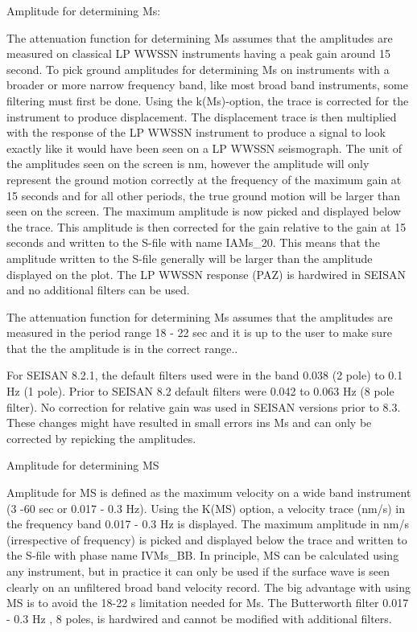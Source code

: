 Amplitude for determining Ms: 

The attenuation function for determining Ms assumes that the amplitudes are measured on classical LP WWSSN instruments having a peak gain around 15 second. To pick ground amplitudes for determining Ms on instruments with a broader or more narrow frequency band, like most broad band instruments, some filtering must first be done. Using the k(Ms)-option, the trace is corrected for the instrument to produce displacement. The displacement trace is then multiplied with the response of the LP WWSSN instrument to produce a signal to look exactly like it would have been seen on a LP WWSSN seismograph. The unit of the amplitudes seen on the screen is nm, however the amplitude will only represent the ground motion correctly at the frequency of the maximum gain at 15 seconds  and for all other periods, the true ground motion will be larger than seen on the screen. The maximum amplitude is now picked and displayed below the trace. This amplitude is then corrected for the gain relative to the gain at 15 seconds and written to the S-file with name IAMs\_20. This means that the amplitude written to the S-file generally will be larger than the amplitude displayed on the plot. The LP WWSSN response (PAZ) is hardwired in SEISAN and no additional filters can be used.

The attenuation function for determining Ms assumes that the amplitudes are measured in the period range 18 - 22 sec and it is up to the user to make sure that the the amplitude is in the correct range.. 

For SEISAN 8.2.1, the default filters used were in the band 0.038 (2 pole) to 0.1 Hz (1 pole). Prior to SEISAN 8.2 default filters were 0.042 to 0.063 Hz (8 pole filter). No correction for relative gain was used in SEISAN versions prior to 8.3. These changes might have resulted in small errors ins Ms and can only be corrected by repicking the amplitudes.

Amplitude for determining MS

Amplitude for MS is defined as the maximum velocity on a wide band instrument (3 -60 sec or 0.017 - 0.3 Hz). Using the K(MS) option, a velocity trace (nm/s) in the frequency band 0.017 - 0.3 Hz is displayed. The maximum amplitude in nm/s (irrespective of frequency) is picked and displayed below the trace and written to the S-file with phase name IVMs\_BB. In principle, MS can be calculated using any instrument, but in practice it can only be used if the surface wave is seen clearly on an unfiltered broad band velocity record. The big advantage with using MS is to avoid the 18-22 s limitation needed for Ms. The Butterworth filter 0.017 - 0.3 Hz , 8 poles, is hardwired and cannot be modified with additional filters.

